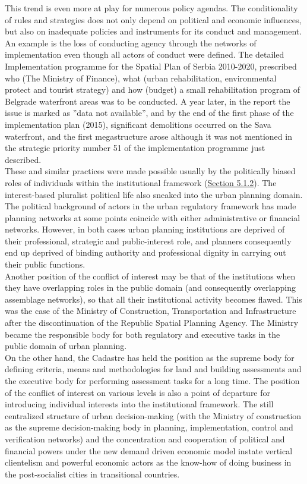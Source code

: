 \documentclass[11pt]{report}
\begin{document}
This trend is even more at play for numerous policy agendas.
The conditionality of rules and strategies does not only depend on political and economic influences, but also on inadequate policies and instruments for its conduct and management.
An example is the loss of conducting agency through the networks of implementation even though all actors of conduct were defined. The detailed Implementation programme for the Spatial Plan of Serbia 2010-2020, prescribed who (The Ministry of Finance), what (urban rehabilitation, environmental protect and tourist strategy) and how (budget) a small rehabilitation program of Belgrade waterfront areas was to be conducted. A year later, in the report the issue is marked as ”data not available”, and by the end of the first phase of the implementation plan (2015), significant demolitions occurred on the Sava waterfront, and the first megastructure arose although it was not mentioned in the strategic priority number 51 of the implementation programme just described.
\\

These and similar practices were made possible usually by the politically biased roles of individuals within the institutional framework (\href{Section 5.1.2}{Section 5.1.2}).
The interest-based pluralist political life also sneaked into the urban planning domain. The political background of actors in the urban regulatory framework has made planning networks at some points coincide with either administrative or financial networks. However, in both cases urban planning institutions are deprived of their professional, strategic and public-interest role, and planners consequently end up deprived of binding authority and professional dignity in carrying out their public functions.
\\

Another position of the conflict of interest may be that of the institutions when they have overlapping roles in the public domain (and consequently overlapping assemblage networks), so that all their institutional activity becomes flawed. This was the case of the Ministry of Construction, Transportation and Infrastructure after the discontinuation of the Republic Spatial Planning Agency. The Ministry became the responsible body for both regulatory and executive tasks in the public domain of urban planning.
\\

On the other hand, the Cadastre has held the position as the supreme body for defining criteria, means and methodologies for land and building assessments and the executive body for performing assessment tasks for a long time. The position of the conflict of interest on various levels is also a point of departure for introducing individual interests into the institutional framework. The still centralized structure of urban decision-making (with the Ministry of construction as the supreme decision-making body in planning, implementation, control and verification networks) and the concentration and cooperation of political and financial powers under the new demand driven economic model instate vertical clientelism and powerful economic actors as the know-how of doing business in the post-socialist cities in transitional countries.
\\
\end{document}
